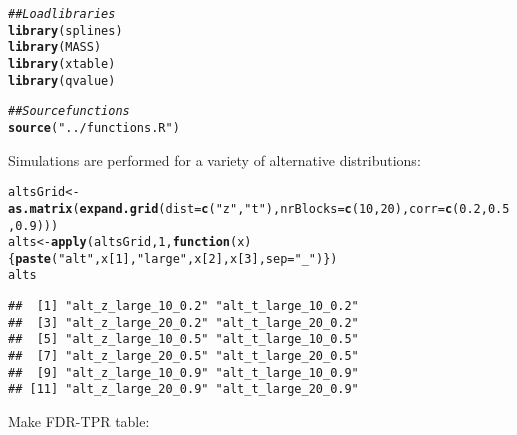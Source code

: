 \documentclass{article}\usepackage[]{graphicx}\usepackage[]{color}
\makeatletter
\newcommand{\hlnum}[1]{\textcolor[rgb]{0.686,0.059,0.569}{#1}}%
\newcommand{\hlstr}[1]{\textcolor[rgb]{0.192,0.494,0.8}{#1}}%
\newcommand{\hlcom}[1]{\textcolor[rgb]{0.678,0.584,0.686}{\textit{#1}}}%
\newcommand{\hlstd}[1]{\textcolor[rgb]{0.345,0.345,0.345}{#1}}%
\newcommand{\hlkwa}[1]{\textcolor[rgb]{0.161,0.373,0.58}{\textbf{#1}}}%
\newcommand{\hlkwb}[1]{\textcolor[rgb]{0.69,0.353,0.396}{#1}}%
\newcommand{\hlkwc}[1]{\textcolor[rgb]{0.333,0.667,0.333}{#1}}%
\newcommand{\hlkwd}[1]{\textcolor[rgb]{0.737,0.353,0.396}{\textbf{#1}}}%
\newenvironment{kframe}{%
 \def\at@end@of@kframe{}%
 \ifinner\ifhmode%
  \def\at@end@of@kframe{\end{minipage}}%
  \begin{minipage}{\columnwidth}%
 \fi\fi%
 \def\FrameCommand##1{\hskip\@totalleftmargin \hskip-\fboxsep
 \colorbox{shadecolor}{##1}\hskip-\fboxsep
     \hskip-\linewidth \hskip-\@totalleftmargin \hskip\columnwidth}%
 \MakeFramed {\advance\hsize-\width
   \@totalleftmargin\z@ \linewidth\hsize
   \@setminipage}}%
 {\par\unskip\endMakeFramed%
 \at@end@of@kframe}
\newenvironment{knitrout}{}{} %
\makeatother
\begin{document}
\begin{knitrout}
\color{fgcolor}\begin{kframe}
\begin{alltt}
\hlcom{## Load libraries}
\hlkwd{library}\hlstd{(splines)}
\hlkwd{library}\hlstd{(MASS)}
\hlkwd{library}\hlstd{(xtable)}
\hlkwd{library}\hlstd{(qvalue)}

\hlcom{##Source functions}
\hlkwd{source}\hlstd{(}\hlstr{"../functions.R"}\hlstd{)}
\end{alltt}
\end{kframe}
\end{knitrout}

Simulations are performed for a variety of alternative distributions:
\begin{knitrout}
\color{fgcolor}\begin{kframe}
\begin{alltt}
\hlstd{altsGrid} \hlkwb{<-} \hlkwd{as.matrix}\hlstd{(}\hlkwd{expand.grid}\hlstd{(}\hlkwc{dist}\hlstd{=}\hlkwd{c}\hlstd{(}\hlstr{"z"}\hlstd{,}\hlstr{"t"}\hlstd{),}\hlkwc{nrBlocks}\hlstd{=}\hlkwd{c}\hlstd{(}\hlnum{10}\hlstd{,}\hlnum{20}\hlstd{),}\hlkwc{corr}\hlstd{=}\hlkwd{c}\hlstd{(}\hlnum{0.2}\hlstd{,}\hlnum{0.5}\hlstd{,}\hlnum{0.9}\hlstd{)))}
\hlstd{alts} \hlkwb{<-} \hlkwd{apply}\hlstd{(altsGrid,} \hlnum{1}\hlstd{,} \hlkwa{function}\hlstd{(}\hlkwc{x}\hlstd{)\{}\hlkwd{paste}\hlstd{(}\hlstr{"alt"}\hlstd{,x[}\hlnum{1}\hlstd{],}\hlstr{"large"}\hlstd{,x[}\hlnum{2}\hlstd{],x[}\hlnum{3}\hlstd{],}\hlkwc{sep}\hlstd{=}\hlstr{"_"}\hlstd{)\})}
\hlstd{alts}
\end{alltt}
\begin{verbatim}
##  [1] "alt_z_large_10_0.2" "alt_t_large_10_0.2"
##  [3] "alt_z_large_20_0.2" "alt_t_large_20_0.2"
##  [5] "alt_z_large_10_0.5" "alt_t_large_10_0.5"
##  [7] "alt_z_large_20_0.5" "alt_t_large_20_0.5"
##  [9] "alt_z_large_10_0.9" "alt_t_large_10_0.9"
## [11] "alt_z_large_20_0.9" "alt_t_large_20_0.9"
\end{verbatim}
\end{kframe}
\end{knitrout}

Make FDR-TPR table:
\end{document}
